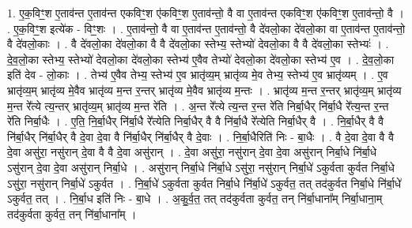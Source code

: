 \documentclass[17pt]{extarticle}
\begin{document}
1. ए॒क॒विꣳ॒॒श ए॒ताव॑न्त ए॒ताव॑न्त एकविꣳ॒॒श ए॑कविꣳ॒॒श ए॒ताव॑न्तो॒ वै वा ए॒ताव॑न्त एकविꣳ॒॒श ए॑कविꣳ॒॒श ए॒ताव॑न्तो॒ वै । . ए॒क॒विꣳ॒॒श इत्ये॑क - विꣳ॒॒शः । . ए॒ताव॑न्तो॒ वै वा ए॒ताव॑न्त ए॒ताव॑न्तो॒ वै दे॑वलो॒का दे॑वलो॒का वा ए॒ताव॑न्त ए॒ताव॑न्तो॒ वै दे॑वलो॒काः । . वै दे॑वलो॒का दे॑वलो॒का वै वै दे॑वलो॒का स्तेभ्य॒ स्तेभ्यो॑ देवलो॒का वै वै दे॑वलो॒का स्तेभ्यः॑ । . दे॒व॒लो॒का स्तेभ्य॒ स्तेभ्यो॑ देवलो॒का दे॑वलो॒का स्तेभ्य॑ ए॒वैव तेभ्यो॑ देवलो॒का दे॑वलो॒का स्तेभ्य॑ ए॒व । . दे॒व॒लो॒का इति॑ देव - लो॒काः । . तेभ्य॑ ए॒वैव तेभ्य॒ स्तेभ्य॑ ए॒व भ्रातृ॑व्य॒म् भ्रातृ॑व्य मे॒व तेभ्य॒ स्तेभ्य॑ ए॒व भ्रातृ॑व्यम् । . ए॒व भ्रातृ॑व्य॒म् भ्रातृ॑व्य मे॒वैव भ्रातृ॑व्य म॒न्त र॒न्तर् भ्रातृ॑व्य मे॒वैव भ्रातृ॑व्य म॒न्तः । . भ्रातृ॑व्य म॒न्त र॒न्तर् भ्रातृ॑व्य॒म् भ्रातृ॑व्य म॒न्त रे᳚त्ये त्य॒न्तर् भ्रातृ॑व्य॒म् भ्रातृ॑व्य म॒न्त रे॑ति । . अ॒न्त रे᳚त्ये त्य॒न्त र॒न्त रे॑ति निर्बा॒धैर् नि॑र्बा॒धै रे᳚त्य॒न्त र॒न्त रे॑ति निर्बा॒धैः । . ए॒ति॒ नि॒र्बा॒धैर् नि॑र्बा॒धै रे᳚त्येति निर्बा॒धैर् वै वै नि॑र्बा॒धै रे᳚त्येति निर्बा॒धैर् वै । . नि॒र्बा॒धैर् वै वै नि॑र्बा॒धैर् नि॑र्बा॒धैर् वै दे॒वा दे॒वा वै नि॑र्बा॒धैर् नि॑र्बा॒धैर् वै दे॒वाः । . नि॒र्बा॒धैरिति॑ निः - बा॒धैः । . वै दे॒वा दे॒वा वै वै दे॒वा असु॑रा॒ नसु॑रान् दे॒वा वै वै दे॒वा असु॑रान् । . दे॒वा असु॑रा॒ नसु॑रान् दे॒वा दे॒वा असु॑रान् निर्बा॒धे नि॑र्बा॒धे ऽसु॑रान् दे॒वा दे॒वा असु॑रान् निर्बा॒धे । . असु॑रान् निर्बा॒धे नि॑र्बा॒धे ऽसु॑रा॒ नसु॑रान् निर्बा॒धे॑ ऽकुर्वता कुर्वत निर्बा॒धे ऽसु॑रा॒ नसु॑रान् निर्बा॒धे॑ ऽकुर्वत । . नि॒र्बा॒धे॑ ऽकुर्वता कुर्वत निर्बा॒धे नि॑र्बा॒धे॑ ऽकुर्वत॒ तत् तद॑कुर्वत निर्बा॒धे नि॑र्बा॒धे॑ ऽकुर्वत॒ तत् । . नि॒र्बा॒ध इति॑ निः - बा॒धे । . अ॒कु॒र्व॒त॒ तत् तद॑कुर्वता कुर्वत॒ तन् नि॑र्बा॒धाना᳚म् निर्बा॒धाना॒म् तद॑कुर्वता कुर्वत॒ तन् नि॑र्बा॒धाना᳚म् । \newline
\end{document}
